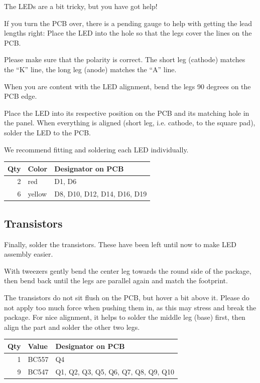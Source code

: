 \documentclass[a4paper,
               11pt,
               parskip=half,
               headinclude,
               titlepage=false]{scrartcl}
\begin{document}
The LEDs are a bit tricky, but you have got help! 

If you turn the PCB over, there is a pending gauge to help with getting the lead lengths right: Place the LED into the hole so that the legs cover the lines on the PCB. 

Please make sure that the polarity is correct. The short leg (cathode) matches the \enquote{K} line, the long leg (anode) matches the \enquote{A} line.

When you are content with the LED alignment, bend the legs 90 degrees on the PCB edge.

Place the LED into its respective position on the PCB and its matching hole in the panel. When everything is aligned (short leg, i.e. cathode, to the square pad), solder the LED to the PCB.

We recommend fitting and soldering each LED individually.

\begin{tabularx}{\textwidth}{| r | l | X |}
\hline
Qty & Color & Designator on PCB \\
\hline
2 &
red &
D1, D6 \\
\hline
6 &
yellow &
D8, D10, D12, D14, D16, D19 \\
\hline
\end{tabularx}


\subsection*{Transistors}

Finally, solder the transistors. These have been left until now to make LED assembly easier.

With tweezers gently bend the center leg towards the round side of the package, then bend back until the legs are parallel again and match the footprint.

The transistors do not sit flush on the PCB, but hover a bit above it. Please do not apply too much force when pushing them in, as this may stress and break the package.
For nice alignment, it helps to solder the middle leg (base) first, then align the part and solder the other two legs.

\begin{tabularx}{\textwidth}{| r | l | X |}
\hline
Qty & Value & Designator on PCB \\
\hline
1 &
BC557 &
Q4 \\
\hline
9 &
BC547 &
Q1, Q2, Q3, Q5, Q6, Q7, Q8, Q9, Q10 \\
\hline
\end{tabularx}
\end{document}
